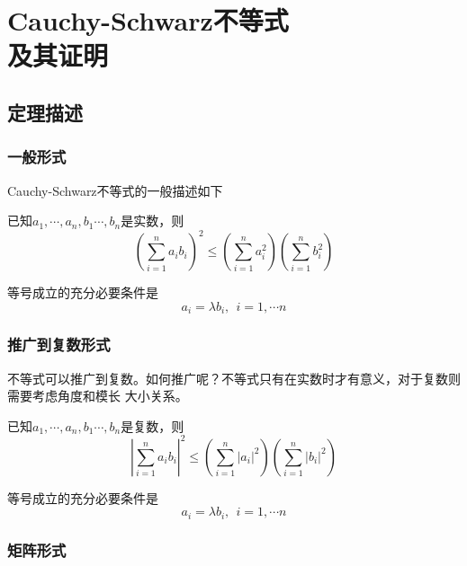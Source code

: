 \chapter{Cauchy-Schwarz不等式\\及其证明}

\section{定理描述}

\subsection*{一般形式}

Cauchy-Schwarz不等式的一般描述如下
\begin{theorem}
    已知$a_1,\cdots,a_n,b_1\cdots,b_n$是实数，则
    \begin{equation}
        (\sum\limits_{i=1}^{n}a_ib_i)^2\leqslant (\sum\limits_{i=1}^{n}a^2_i)(\sum\limits_{i=1}^{n}b^2_i) 
    \end{equation}

    等号成立的充分必要条件是
    \begin{equation}
        a_i=\lambda b_i,\ \ i=1,\cdots n
    \end{equation}
\end{theorem}

\subsection*{推广到复数形式}
不等式可以推广到复数。如何推广呢？不等式只有在实数时才有意义，对于复数则需要考虑角度和模长
大小关系。

\begin{theorem}
    已知$a_1,\cdots,a_n,b_1\cdots,b_n$是复数，则
    \begin{equation}
        |\sum\limits_{i=1}^{n}a_ib_i|^2\leqslant (\sum\limits_{i=1}^{n}|a_i|^2)(\sum\limits_{i=1}^{n}|b_i|^2) 
    \end{equation}

    等号成立的充分必要条件是
    \begin{equation}
        a_i=\lambda b_i,\ \ i=1,\cdots n
    \end{equation}
\end{theorem}

\subsection*{矩阵形式}

